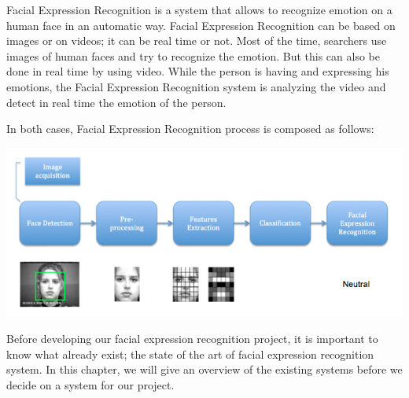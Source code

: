 \noindent Facial Expression Recognition is a system that allows to recognize emotion on a human face in an automatic way. Facial Expression Recognition can be based on images or on videos; it can be real time or not. Most of the time, searchers use images of human faces and try to recognize the emotion. But this can also be done in real time by using video. While the person is having and expressing his emotions, the Facial Expression Recognition system is analyzing the video and detect in real time the emotion of the person.
\newline

\noindent In both cases, Facial Expression Recognition process is composed as follows:


\noindent \includegraphics[scale=0.6]{figures/facial_expression_recognition_process}

\noindent Before developing our facial expression recognition project, it is important to know what already exist; the state of the art of facial expression recognition system. In this chapter, we will give an overview of the existing systems before we decide on a system for our project.


